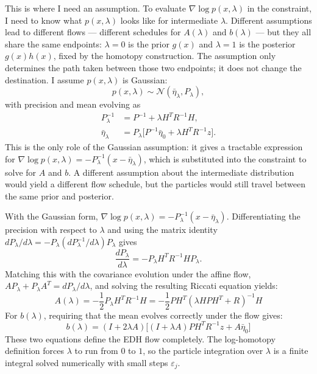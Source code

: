 \documentclass{article}
\begin{document}
This is where I need an assumption. To evaluate $\nabla \log p(x,\lambda)$ in the constraint, I need to know what $p(x,\lambda)$ looks like for intermediate $\lambda$. Different assumptions lead to different flows --- different schedules for $A(\lambda)$ and $b(\lambda)$ --- but they all share the same endpoints: $\lambda = 0$ is the prior $g(x)$ and $\lambda = 1$ is the posterior $g(x)h(x)$, fixed by the homotopy construction. The assumption only determines the path taken between those two endpoints; it does not change the destination. I assume $p(x,\lambda)$ is Gaussian:
\begin{equation}
    p(x,\lambda) \sim \mathcal{N}(\bar{\eta}_\lambda, P_\lambda),
\end{equation}
with precision and mean evolving as
\begin{align}
    P_\lambda^{-1} &= P^{-1} + \lambda H^T R^{-1} H, \\
    \bar{\eta}_\lambda &= P_\lambda\bigl[P^{-1}\bar{\eta}_0 + \lambda H^T R^{-1} z\bigr].
\end{align}
This is the only role of the Gaussian assumption: it gives a tractable expression for $\nabla \log p(x,\lambda) = -P_\lambda^{-1}(x - \bar{\eta}_\lambda)$, which is substituted into the constraint to solve for $A$ and $b$. A different assumption about the intermediate distribution would yield a different flow schedule, but the particles would still travel between the same prior and posterior.

With the Gaussian form, $\nabla \log p(x,\lambda) = -P_\lambda^{-1}(x - \bar{\eta}_\lambda)$. Differentiating the precision with respect to $\lambda$ and using the matrix identity $dP_\lambda/d\lambda = -P_\lambda(dP_\lambda^{-1}/d\lambda)P_\lambda$ gives
\begin{equation}
    \frac{dP_\lambda}{d\lambda} = -P_\lambda H^T R^{-1} H P_\lambda.
\end{equation}
Matching this with the covariance evolution under the affine flow, $AP_\lambda + P_\lambda A^T = dP_\lambda/d\lambda$, and solving the resulting Riccati equation yields:
\begin{equation}
\boxed{A(\lambda) = -\frac{1}{2} P_\lambda H^T R^{-1} H = -\frac{1}{2} P H^T (\lambda H P H^T + R)^{-1} H}
\end{equation}
For $b(\lambda)$, requiring that the mean evolves correctly under the flow gives:
\begin{equation}
\boxed{b(\lambda) = (I + 2\lambda A)\bigl[(I + \lambda A) P H^T R^{-1} z + A \bar{\eta}_0\bigr]}
\end{equation}
These two equations define the EDH flow completely. The log-homotopy definition forces $\lambda$ to run from $0$ to $1$, so the particle integration over $\lambda$ is a finite integral solved numerically with small steps $\varepsilon_j$.
\end{document}
